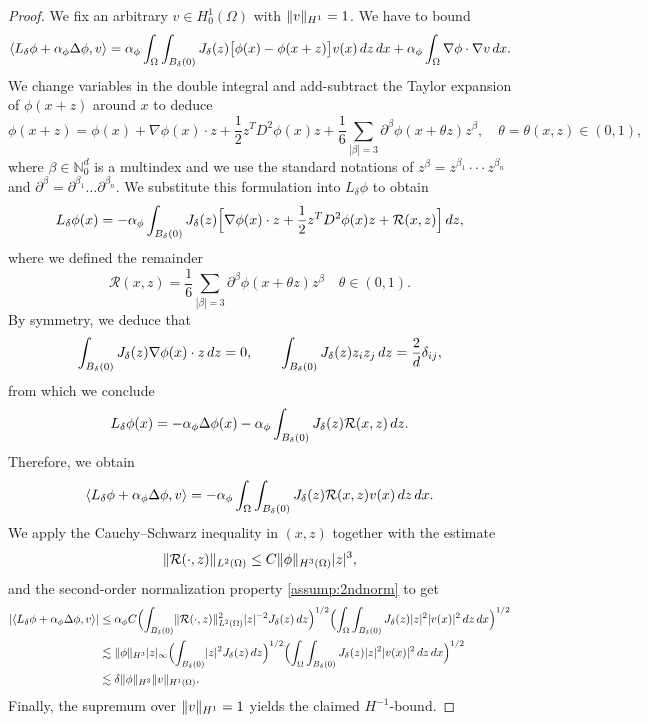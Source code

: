 \documentclass[10pt,a4paper]{amsart}
\DeclarePairedDelimiter{\abs}{\lvert}{\rvert}
\DeclarePairedDelimiter{\norm}{\lVert}{\rVert}
\newcommand{\dx}{\,\textup{d}x}
\newcommand{\dz}{\,\textup{d}z}
\begin{document}
\begin{proof}
	We fix an arbitrary $v\in H_0^1(\Omega)$ with $\norm{v}_{H^1}=1$.  We have to bound
	\[
	\langle L_\delta\phi + \alpha_\phi\Delta\phi,v\rangle
	= \alpha_\phi\int_\Omega\int_{B_\delta(0)}
	J_\delta(z)\bigl[\phi(x)-\phi(x+z)\bigr]v(x)\dz\dx
	+\alpha_\phi\int_\Omega\nabla\phi\cdot\nabla v\dx.
	\]
	We change variables in the double integral and add-subtract the Taylor expansion of $\phi(x+z)$ around $x$ to deduce
	\[
	\phi(x+z)=\phi(x)+\nabla\phi(x)\cdot z+\frac12z^TD^2\phi(x)z
	+\frac16\sum_{|\beta|=3}\partial^\beta\phi(x+\theta z)z^\beta, \quad \theta=\theta(x,z)\in(0,1),
	\]
	where $\beta \in \mathbb{N}_0^d$ is a multindex and we use the standard notations of $z^\beta=z^{\beta_1}\cdot \cdot \cdot z^{\beta_n}$ and $\partial^\beta=\partial^{\beta_1} \dots \partial^{\beta_n}$.
	We substitute this formulation into $L_\delta\phi$ to obtain
	\[
	L_\delta\phi(x)
	=-\alpha_\phi\int_{B_\delta(0)} J_\delta(z)\Bigl[\nabla\phi(x)\cdot z
	+\frac12z^TD^2\phi(x)z
	+\mathcal R(x,z)\Bigr]\dz,
	\]
	where we defined the remainder
	\[
	\mathcal R(x,z)
	=\frac16\sum_{|\beta|=3}\partial^\beta\phi(x+\theta z)z^\beta \quad \theta \in (0,1).
	\]
	By symmetry, we deduce that
	\[
	\int_{B_\delta(0)} J_\delta(z)\nabla\phi(x)\cdot z\dz=0,
	\qquad
	\int_{B_\delta(0)} J_\delta(z)z_i z_j\dz=\frac2d\delta_{ij},
	\]
	from which we conclude
	\[
	L_\delta\phi(x)
	=-\alpha_\phi\Delta\phi(x)
	-
	\alpha_\phi\int_{B_\delta(0)} J_\delta(z)\mathcal R(x,z)\dz.
	\]
	Therefore, we obtain
	\[
	\langle L_\delta\phi + \alpha_\phi\Delta\phi,v\rangle
	= -\alpha_\phi\int_{\Omega}\int_{B_\delta(0)}
	J_\delta(z)\mathcal R(x,z)v(x)\dz\dx.
	\]
	We apply the Cauchy--Schwarz inequality in $(x,z)$ together with the estimate
	\[
	\norm{\mathcal R(\cdot ,z)}_{L^2(\Omega)}\le C\norm{\phi}_{H^3(\Omega)}\abs{z}^3,
	\]
	and the second-order normalization property \eqref{assump:2ndnorm} to get
	\[
	\begin{aligned}
		\abs{\langle L_\delta\phi + \alpha_\phi\Delta\phi,v\rangle}
		&\le\alpha_\phi C 
		\Bigl(\int_{B_\delta(0)} \norm{\mathcal R(\cdot ,z)}_{L^2(\Omega)}^2 \abs{z}^{-2} J_\delta(z)\dz\Bigr)^{1/2}
		\Bigl(\int_\Omega\int_{B_\delta(0)} J_\delta(z)\abs{z}^2|v(x)|^2\dz\dx\Bigr)^{1/2}
		\\
		&\lesssim \norm{\phi}_{H^3} \abs{z}_\infty 
		\Bigl(\int_{B_\delta(0)} \abs{z}^{2} J_\delta(z)\dz\Bigr)^{1/2}
		\Bigl(\int_\Omega\int_{B_\delta(0)} J_\delta(z)\abs{z}^2|v(x)|^2\dz\dx\Bigr)^{1/2}
		\\ &\lesssim \delta\norm{\phi}_{H^3}\norm{v}_{H^1(\Omega)}.
	\end{aligned}
	\]
	Finally, the supremum over $\norm{v}_{H^1}=1$ yields the claimed $H^{-1}$-bound.
\end{proof}
\end{document}
